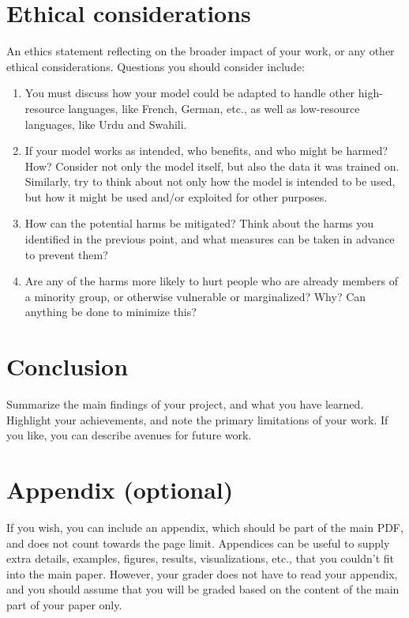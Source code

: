 \documentclass[11pt]{article}
\begin{document}
\section{Ethical considerations}
An ethics statement reflecting on the broader impact of your work, or any other ethical considerations. Questions you should consider include: 
\begin{enumerate}
    \item You must discuss how your model could be adapted to handle other high-resource languages, like French, German, etc., as well as low-resource languages, like Urdu and Swahili.
    \item If your model works as intended, who benefits, and who might be harmed? How? Consider not only the model itself, but also the data it was trained on. Similarly, try to think about not only how the model is intended to be used, but how it might be used and/or exploited for other purposes.
    \item How can the potential harms be mitigated? Think about the harms you identified in the previous point, and what measures can be taken in advance to prevent them?
    \item Are any of the harms more likely to hurt people who are already members of a minority group, or otherwise vulnerable or marginalized? Why? Can anything be done to minimize this?
\end{enumerate}



\section{Conclusion}
Summarize the main findings of your project, and what you have learned. Highlight your achievements, and note the primary limitations of your work. If you like, you can describe avenues for future work.






\appendix

\section{Appendix (optional)}
If you wish, you can include an appendix, which should be part of the main PDF, and does not count towards the page limit. Appendices can be useful to supply extra details, examples, figures, results, visualizations, etc., that you couldn’t fit into the main paper. However, your grader does not have to read your appendix, and you should assume that you will be graded based on the content of the main part of your paper only.
\end{document}
